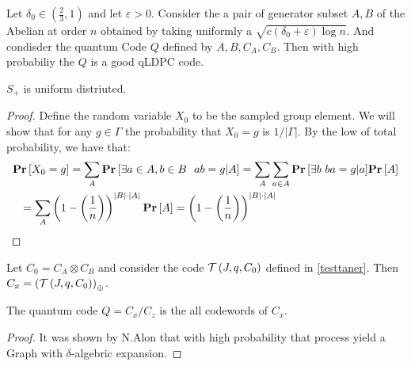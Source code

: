 \begin{theorem*} 
Let $\delta_{0} \in \left( \frac{2}{3} ,1 \right)$ and let $\varepsilon > 0$. Consider the a pair of generator subset $A,B$ of the Abelian at order $n$ obtained by taking uniformly a $ \sqrt{ c\left( \delta_{0} + \varepsilon \right)\log n }$. And condisder the quantum Code $Q$ defined by $A,B,C_{A},C_{B}$.  Then with high probabiliy the $Q$ is a good qLDPC code.
\end{theorem*}
\begin{claim} \label{unif}
  $S_{+}$ is uniform distriuted. 
\end{claim}
\begin{proof}
  Define the random variable $X_{0}$ to be the sampled group element. We will show that for any $g \in \Gamma $ the probability that $X_{0} = g$ is $1/|\Gamma|$. By the low of total probability, we have that:     
  \begin{equation*}
    \begin{split}
      & \prb{X_{0} = g} = \sum_{A}{ \prb{ \exists a \in A, b \in B \ \ ab = g | A } } = \sum_{A}{ \sum_{a\in A} {\prb{ \exists b \  ba= g | a } } \prb{ A }  } \\ 
      & \ \ =  \sum_{A}{  \left( 1 -   \left( \frac{1}{n} \right) \right)^{|B| \cdot |A| }   \prb{ A }  } =  \left( 1 -   \left( \frac{1}{n} \right) \right)^{|B| \cdot |A| } 
    \end{split}
  \end{equation*}
\end{proof}
\begin{claim}
  Let $C_{0} = C_{A}\otimes C_{B}$ and consider the code $\mathcal{T}\left(J, q , C_{0}\right)$ defined in \ref{testtaner}. Then $C_{x} = \left( \mathcal{T}\left(J, q , C_{0}\right) \right)_{\oplus}$. 
\end{claim}
\begin{claim}
  The quantum code $Q = C_{x}/ C_{z}$ is the all \ireducable codewords of $C_{x}$.   
\end{claim}
\begin{proof}
  It was shown by N.Alon \cite{Noga}  that with high probability that process yield a Graph with $\delta$-algebric expansion.
  \end{proof}
